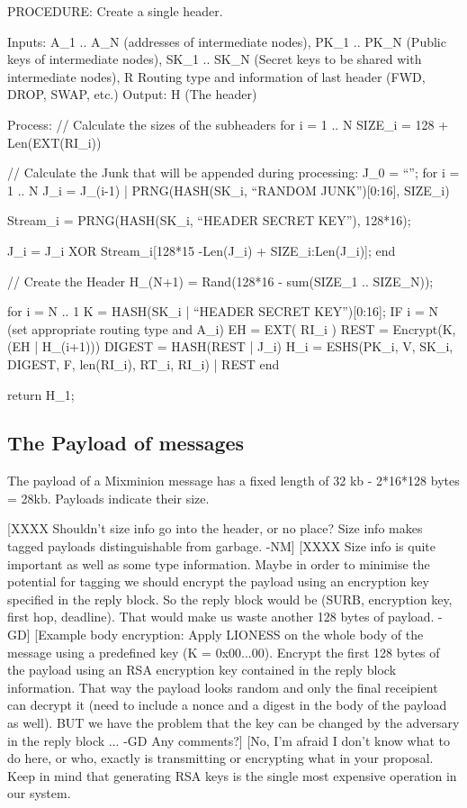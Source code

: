 PROCEDURE: Create a single header.

Inputs: A_1 .. A_N (addresses of intermediate nodes), 
	PK_1 .. PK_N (Public keys of intermediate nodes),
	SK_1 .. SK_N (Secret keys to be shared with intermediate nodes),
        R Routing type and information of last header (FWD, DROP, SWAP, etc.)
Output: H (The header)

Process: 
  // Calculate the sizes of the subheaders
  for i = 1 .. N
	SIZE_i = 128 + Len(EXT(RI_i))

  // Calculate the Junk that will be appended during processing:
  J_0 = ``'';
  for i = 1 .. N
	J_i = J_(i-1) | PRNG(HASH(SK_i, ``RANDOM JUNK'')[0:16], SIZE_i)

        Stream_i = PRNG(HASH(SK_i, ``HEADER SECRET KEY''), 128*16);

	J_i = J_i XOR Stream_i[128*15 -Len(J_i) + SIZE_i:Len(J_i)];
  end

  // Create the Header
  H_(N+1) = Rand(128*16 - sum(SIZE_1 .. SIZE_N));

  for i = N .. 1
	K = HASH(SK_i | ``HEADER SECRET KEY'')[0:16];
	IF i = N (set appropriate routing type and A_i)
	EH = EXT( RI_i )
        REST = Encrypt(K, (EH | H_(i+1)))
  	DIGEST = HASH(REST | J_i)
	H_i = ESHS(PK_i, V, SK_i, DIGEST, F, len(RI_i), RT_i, RI_i) | REST
  end

return H_1;

\subsection{The Payload of messages}

The payload of a Mixminion message has a fixed length of 32 kb
- 2*16*128 bytes = 28kb.   Payloads indicate their size.

  [XXXX Shouldn't size info go into the header, or no place?  Size
     info makes tagged payloads distinguishable from garbage. -NM]
  [XXXX Size info is quite important as well as some type information.
     Maybe in order to minimise the potential for tagging we should
     encrypt the payload using an encryption key specified in the
     reply block. So the reply block would be (SURB, encryption key,
     first hop, deadline). That would make us waste another 128 bytes
     of payload. -GD]
  [Example body encryption: Apply LIONESS on the whole body of the
     message using a predefined key (K = 0x00...00). Encrypt the first
     128 bytes of the payload using an RSA encryption key contained in
     the reply block information. That way the payload looks random
     and only the final receipient can decrypt it (need to include a
     nonce and a digest in the body of the payload as well). BUT we
     have the problem that the key can be changed by the adversary in
     the reply block ... -GD Any comments?]
  [No, I'm afraid I don't know what to do here, or who, exactly is
     transmitting or encrypting what in your proposal.  Keep in mind 
     that generating RSA keys is the single most expensive operation
     in our system.
 
